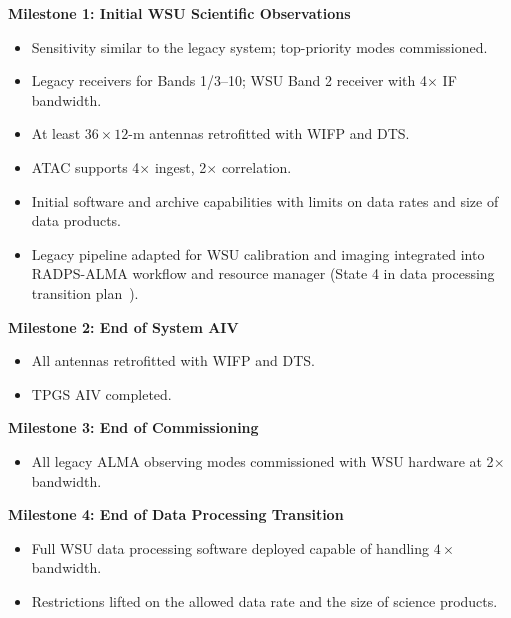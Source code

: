 \noindent\textcolor{milestoneblue}{\textbf{Milestone 1: Initial WSU Scientific Observations}}\par
\vspace{-0.6\baselineskip} %
\begin{itemize}[itemsep=-0.5em]
    \item Sensitivity similar to the legacy system; top-priority modes commissioned.
    \item Legacy receivers for Bands 1/3--10; WSU Band 2 receiver with 4$\times$ IF bandwidth.
    \item At least $36\times12$-m antennas retrofitted with \ac{WIFP} and \ac{DTS}. 
    \item \ac{ATAC} supports 4$\times$ ingest, 2$\times$ correlation.
    \item Initial software and archive capabilities with  limits on data rates and size of data products.
    \item Legacy pipeline adapted for WSU calibration and imaging integrated into RADPS-ALMA  workflow and resource manager (State 4 in data processing transition plan~\cite{dp_tp}).
\end{itemize}\vspace{0pt}

\noindent\textcolor{milestoneblue}{\textbf{Milestone 2: End of System \ac{AIV}}}\par
\vspace{-0.6\baselineskip}
\begin{itemize}[itemsep=-0.5em]
    \item All antennas retrofitted with \ac{WIFP} and \ac{DTS}.
    \item \ac{TPGS} \ac{AIV} completed.
\end{itemize}\vspace{0pt}

\noindent\textcolor{milestoneblue}{\textbf{Milestone 3: End of Commissioning}}\par
\vspace{-0.6\baselineskip}
\begin{itemize}[itemsep=-0.5em]
    \item All legacy ALMA observing modes commissioned with WSU hardware at 2$\times$ bandwidth.
\end{itemize}\vspace{0pt}

\noindent\textcolor{milestoneblue}{\textbf{Milestone 4: End of Data Processing Transition}}\par
\vspace{-0.6\baselineskip}
\begin{itemize}[itemsep=-0.5em]
    \item Full \ac{WSU} data processing software deployed capable of handling $4\times$ bandwidth.
    \item Restrictions lifted on the allowed data rate and the size of science products.
\end{itemize}\vspace{0pt}

